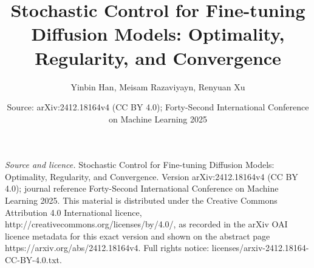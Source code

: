 \documentclass[10pt,a4paper]{amsart}
\begin{document}
\title[Regularity and well-posedness for the KL-regularized control problem]{Stochastic Control for Fine-tuning Diffusion Models: Optimality, Regularity, and Convergence}
\author{Yinbin Han, Meisam Razaviyayn, Renyuan Xu}
\date{Source: arXiv:2412.18164v4 (CC BY 4.0); Forty-Second International Conference on Machine Learning 2025}
\maketitle
\noindent\emph{Source and licence.} Stochastic Control for Fine-tuning Diffusion Models: Optimality, Regularity, and Convergence. Version arXiv:2412.18164v4 (CC BY 4.0); journal reference Forty-Second International Conference on Machine Learning 2025. This material is distributed under the Creative Commons Attribution 4.0 International licence, http://creativecommons.org/licenses/by/4.0/, as recorded in the arXiv OAI licence metadata for this exact version and shown on the abstract page https://arxiv.org/abs/2412.18164v4. Full rights notice: licenses/arxiv-2412.18164-CC-BY-4.0.txt.\par\smallskip
\end{document}

